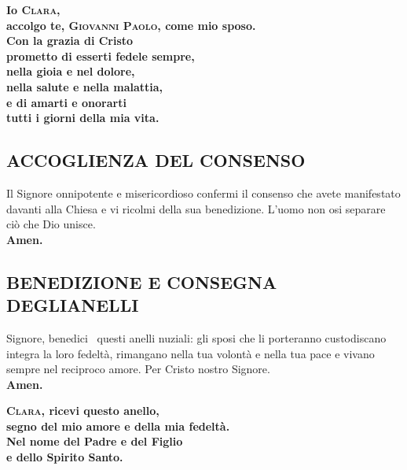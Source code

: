 \documentclass[10pt,b6paper,usenames,twoside]{article}
\begin{document}
\begin{large} 
\noindent \textbf{Io \textcolor{forestgreen(traditional)}{\textsc{Clara}},\\
accolgo te, \textcolor{forestgreen(traditional)}{\textsc{Giovanni Paolo}}, come mio sposo.\\ 
Con la grazia di Cristo\\ 
prometto di esserti fedele sempre,\\ 
nella gioia e nel dolore,\\ 
nella salute e nella malattia,\\ 
e di amarti e onorarti\\ 
tutti i giorni della mia vita.} 
\end{large} 

\subsection*{\textcolor{forestgreen(traditional)}{ACCOGLIENZA DEL CONSENSO}} 

\noindent Il Signore onnipotente e misericordioso confermi il consenso che avete manifestato davanti alla Chiesa e vi ricolmi della sua benedizione.
L’uomo non osi separare ciò che Dio unisce.\\ 
\textbf{Amen.} 

\subsection*{\textcolor{forestgreen(traditional)}{BENEDIZIONE E CONSEGNA DEGLI\linebreak ANELLI}} 

\noindent Signore, benedici \textcolor{forestgreen(traditional)}{\CrossMaltese}\ questi anelli nuziali: gli sposi che li porteranno custodiscano integra la loro fedeltà, rimangano nella tua volontà e nella tua pace e vivano sempre nel reciproco amore. Per Cristo nostro Signore.\\ 
\textbf{Amen.}\\ 

\begin{large} 
\noindent \textbf{\textcolor{forestgreen(traditional)}{\textsc{Clara}}, ricevi questo anello,\\ 
segno del mio amore e della mia fedeltà.\\ 
Nel nome del Padre e del Figlio\\ 
e dello Spirito Santo.} 
\end{large}\\ 
\end{document}
